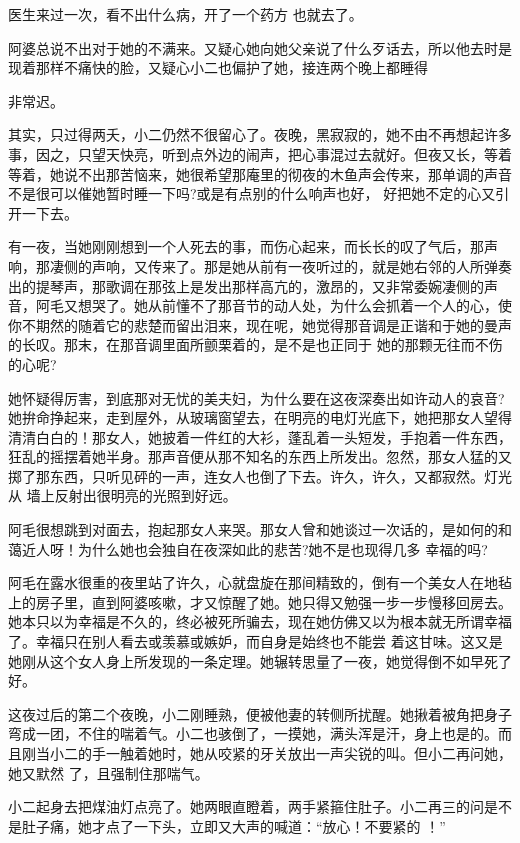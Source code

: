 \documentclass{article}
\begin{document}
医生来过一次，看不出什么病，开了一个药方
也就去了。 

阿婆总说不出对于她的不满来。又疑心她向她父亲说了什么歹话去，所以他去时是现着那样不痛快的脸，又疑心小二也偏护了她，接连两个晚上都睡得

\newpage
非常迟。 

其实，只过得两夭，小二仍然不很留心了。夜晚，黑寂寂的，她不由不再想起许多事，因之，只望天快亮，听到点外边的闹声，把心事混过去就好。但夜又长，等着等着，她说不出那苦恼来，她很希望那庵里的彻夜的木鱼声会传来，那单调的声音不是很可以催她暂时睡一下吗?或是有点别的什么响声也好，
好把她不定的心又引开一下去。 


有一夜，当她刚刚想到一个人死去的事，而伤心起来，而长长的叹了气后，那声响，那凄侧的声响，又传来了。那是她从前有一夜听过的，就是她右邻的人所弹奏出的提琴声，那歌调在那弦上是发出那样高亢的，激昂的，又非常委婉凄侧的声音，阿毛又想哭了。她从前懂不了那音节的动人处，为什么会抓着一个人的心，使你不期然的随着它的悲楚而留出泪来，现在呢，她觉得那音调是正谐和于她的曼声的长叹。那末，在那音调里面所颤栗着的，是不是也正同于
她的那颗无往而不伤的心呢? 

\newpage

她怀疑得厉害，到底那对无忧的美夫妇，为什么要在这夜深奏出如许动人的哀音?她拚命挣起来，走到屋外，从玻璃窗望去，在明亮的电灯光底下，她把那女人望得清清白白的！那女人，她披着一件红的大衫，蓬乱着一头短发，手抱着一件东西，狂乱的摇摆着她半身。那声音便从那不知名的东西上所发出。忽然，那女人猛的又掷了那东西，只听见砰的一声，连女人也倒了下去。许久，许久，又都寂然。灯光从
墙上反射出很明亮的光照到好远。 

阿毛很想跳到对面去，抱起那女人来哭。那女人曾和她谈过一次话的，是如何的和蔼近人呀！为什么她也会独自在夜深如此的悲苦?她不是也现得几多
幸福的吗? 

阿毛在露水很重的夜里站了许久，心就盘旋在那间精致的，倒有一个美女人在地毡上的房子里，直到阿婆咳嗽，才又惊醒了她。她只得又勉强一步一步慢移回房去。她本只以为幸福是不久的，终必被死所骗去，现在她仿佛又以为根本就无所谓幸福了。幸福只在别人看去或羡慕或嫉妒，而自身是始终也不能尝
\newpage
着这甘味。这又是她刚从这个女人身上所发现的一条定理。她辗转思量了一夜，她觉得倒不如早死了好。


这夜过后的第二个夜晚，小二刚睡熟，便被他妻的转侧所扰醒。她揪着被角把身子弯成一团，不住的喘着气。小二也骇倒了，一摸她，满头浑是汗，身上也是的。而且刚当小二的手一触着她时，她从咬紧的牙关放出一声尖锐的叫。但小二再问她，她又默然
了，且强制住那喘气。 

小二起身去把煤油灯点亮了。她两眼直瞪着，两手紧箍住肚子。小二再三的问是不是肚子痛，她才点了一下头，立即又大声的喊道：“放心！不要紧的
！” 
\end{document}
